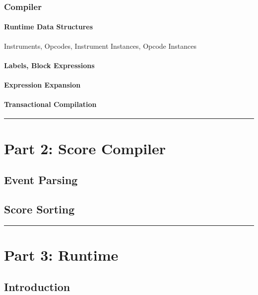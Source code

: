 \subsubsection{Compiler}

\paragraph{Runtime Data Structures}

Instruments, Opcodes, Instrument Instances, Opcode Instances

\paragraph{Labels, Block Expressions}

\paragraph{Expression Expansion}

\paragraph{Transactional Compilation}

\begin{center}\rule{3in}{0.4pt}\end{center}

\section{Part 2: Score Compiler}

\subsection{Event Parsing}

\subsection{Score Sorting}

\begin{center}\rule{3in}{0.4pt}\end{center}

\section{Part 3: Runtime}

\subsection{Introduction}

